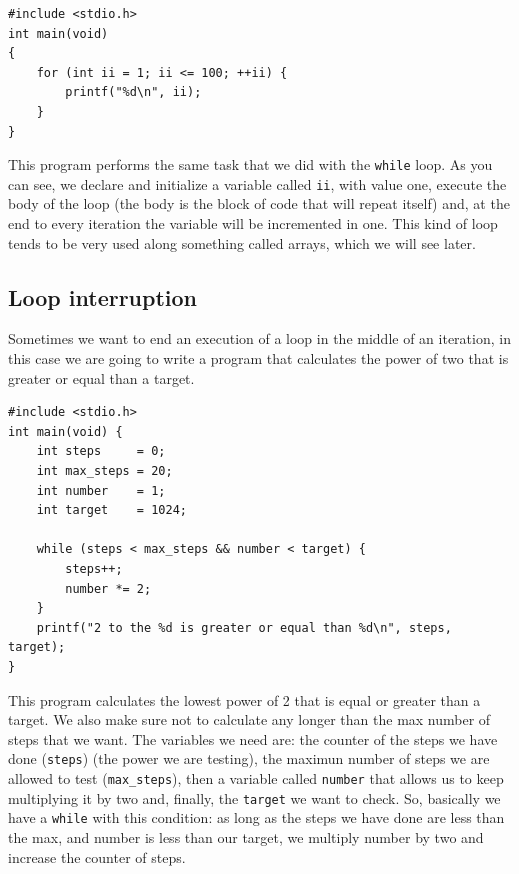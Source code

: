 \documentclass[a4paper]{article}
\begin{document}
\noindent
\begin{minipage}[H]{\linewidth}
\mbox{}
\begin{lstlisting}[style=C,
caption={Example of a program with a \texttt{for} loop},
label={lst:forStructure}]
#include <stdio.h>
int main(void)
{
    for (int ii = 1; ii <= 100; ++ii) {
        printf("%d\n", ii);
    }
}
\end{lstlisting}
\end{minipage}

This program performs the same task that we did with the \texttt{while} loop.
As you can see, we declare and initialize a variable called \texttt{ii}, with
value one, execute the body of the loop (the body is the block of code that
will repeat itself) and, at the end to every iteration the variable will be
incremented in one. This kind of loop tends to be very used along something
called arrays, which we will see later.

\subsection{Loop interruption}
Sometimes we want to end an execution of a loop in the middle of an iteration,
in this case we are going to write a program that calculates the power of two
that is greater or equal than a target.

\noindent
\begin{minipage}[H]{\linewidth}
\mbox{}
\begin{lstlisting}[style=C,
caption={Example of interruption of a loop with an auxiliary variable},
label={lst:loopInterruption}]
#include <stdio.h>
int main(void) {
    int steps     = 0;
    int max_steps = 20;
    int number    = 1;
    int target    = 1024;

    while (steps < max_steps && number < target) {
        steps++;
        number *= 2;
    }
    printf("2 to the %d is greater or equal than %d\n", steps, target);
}
\end{lstlisting}
\end{minipage}

This program calculates the lowest power of 2 that is equal or greater than a
target. We also make sure not to calculate any longer than the max number of
steps that we want.
The variables we need are: the counter of the steps we have done
(\texttt{steps}) (the power we
are testing), the maximun number of steps we are allowed to test
(\texttt{max\_steps}), then a
variable called \texttt{number} that allows us to keep multiplying it by two
and, finally, the \texttt{target} we want to check.
So, basically we have a \texttt{while} with this condition:
as long as the steps we have done are less than the max, and number is less than
our target, we multiply number by two and increase the counter of steps.
\end{document}
